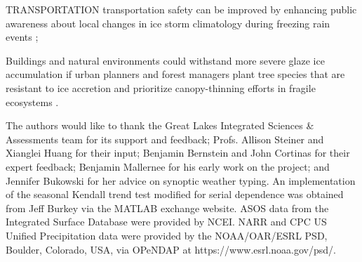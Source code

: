 \documentclass[twocol]{ametsoc}
\begin{document}
TRANSPORTATION 
transportation safety can be improved by enhancing public awareness about local changes in ice storm climatology during freezing rain events \citep{call2009assessment}; 


Buildings and natural environments could withstand more severe glaze ice accumulation if urban planners and forest managers plant tree species that are resistant to ice accretion and prioritize canopy-thinning efforts in fragile ecosystems \citep{hauer2006trees}.


\nocite{*}


%
\acknowledgments
The authors would like to thank the Great Lakes Integrated Sciences \& Assessments team for its support and feedback; Profs. Allison Steiner and Xianglei Huang for their input; Benjamin Bernstein and John Cortinas for their expert feedback; Benjamin Mallernee for his early work on the project; and Jennifer Bukowski for her advice on synoptic weather typing. An implementation of the seasonal Kendall trend test modified for serial dependence was obtained from Jeff Burkey via the MATLAB exchange website. ASOS data from the Integrated Surface Database were provided by NCEI. NARR and CPC US Unified Precipitation data were provided by the NOAA/OAR/ESRL PSD, Boulder, Colorado, USA, via OPeNDAP at https://www.esrl.noaa.gov/psd/.  



\end{document}
